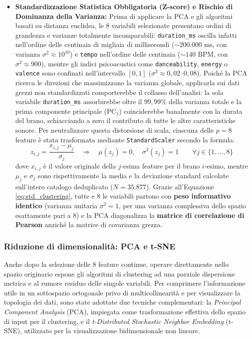 \documentclass[12pt,a4paper]{article}
\begin{document}
\begin{itemize}
    \item \textbf{Standardizzazione Statistica Obbligatoria (Z-score) e Rischio di Dominanza della Varianza:} Prima di applicare la PCA e gli algoritmi basati su distanza euclidea, le 8 variabili selezionate presentano ordini di grandezza e varianze totalmente incomparabili: \texttt{duration\_ms} oscilla infatti nell'ordine delle centinaia di migliaia di millisecondi ($\sim 200.000\text{ ms}$, con varianza $\sigma^2 \approx 10^{10}$) e \texttt{tempo} nell'ordine delle centinaia ($\sim 140\text{ BPM}$, con $\sigma^2 \approx 900$), mentre gli indici psicoacustici come \texttt{danceability}, \texttt{energy} o \texttt{valence} sono confinati nell'intervallo $[0, 1]$ ($\sigma^2 \approx 0,02\text{--}0,08$). Poiché la PCA ricerca le direzioni che massimizzano la varianza globale, applicarla sui dati grezzi non standardizzati comporterebbe il collasso dell'analisi: la sola variabile \texttt{duration\_ms} assorbirebbe oltre il $99,99\%$ della varianza totale e la prima componente principale ($\text{PC}_1$) coinciderebbe banalmente con la durata del brano, schiacciando a zero il contributo di tutte le altre caratteristiche sonore. Per neutralizzare questa distorsione di scala, ciascuna delle $p=8$ feature è stata trasformata mediante \texttt{StandardScaler} secondo la formula:
    \begin{equation}
    \boxed{z_{i,j} = \frac{x_{i,j} - \mu_j}{\sigma_j} \quad \Longrightarrow \quad \mu(z_j) = 0, \quad \sigma^2(z_j) = 1 \qquad \forall j \in \{1, \dots, 8\}}
    \label{eq:std_clustering}
    \end{equation}
    dove $x_{i,j}$ è il valore originale della $j$-esima feature per il brano $i$-esimo, mentre $\mu_j$ e $\sigma_j$ sono rispettivamente la media e la deviazione standard calcolate sull'intero catalogo deduplicato ($N = 35.877$). Grazie all'Equazione \ref{eq:std_clustering}, tutte e 8 le variabili partono con \textbf{peso informativo identico} (varianza unitaria $\sigma^2 = 1$, per una varianza complessiva dello spazio esattamente pari a $8$) e la PCA diagonalizza la \textbf{matrice di correlazione di Pearson} anziché la matrice di covarianza grezza.
\end{itemize}

\subsubsection{Riduzione di dimensionalità: PCA e t-SNE}

Anche dopo la selezione delle 8 feature continue, operare direttamente nello spazio originario espone gli algoritmi di clustering ad una parziale dispersione metrica e al rumore residuo delle singole variabili. Per comprimere l'informazione utile in un sottospazio ortogonale privo di multicollinearità e per visualizzare la topologia dei dati, sono state adottate due tecniche complementari: la \textit{Principal Component Analysis} (PCA), impiegata come trasformazione effettiva dello spazio di input per il clustering, e il \textit{t-Distributed Stochastic Neighbor Embedding} (t-SNE), utilizzato per la visualizzazione bidimensionale non lineare.
\end{document}

